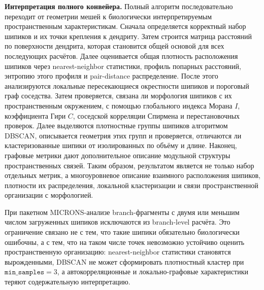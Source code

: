 \documentclass[12pt,a4paper]{article}
\begin{document}
\noindent\textbf{Интерпретация полного конвейера.}
Полный алгоритм последовательно переходит от геометрии мешей к биологически интерпретируемым пространственным характеристикам. Сначала определяется корректный набор шипиков и их точки крепления к дендриту. Затем строится матрица расстояний по поверхности дендрита, которая становится общей основой для всех последующих расчётов. Далее оценивается общая плотность расположения шипиков через nearest-neighbor статистики, профиль попарных расстояний, энтропию этого профиля и pair-distance распределение. После этого анализируются локальные пересекающиеся окрестности шипиков и пороговый граф соседства. Затем проверяется, связана ли морфология шипиков с их пространственным окружением, с помощью глобального индекса Морана \(I\), коэффициента Гири \(C\), соседской корреляции Спирмена и перестановочных проверок. Далее выделяются плотностные группы шипиков алгоритмом DBSCAN, описывается геометрия этих групп и проверяется, отличаются ли кластеризованные шипики от изолированных по объёму и длине. Наконец, графовые метрики дают дополнительное описание модульной структуры пространственных связей. Таким образом, результатом является не только набор отдельных метрик, а многоуровневое описание взаимного расположения шипиков, плотности их распределения, локальной кластеризации и связи пространственной организации с морфологией.

При пакетном MICRONS-анализе branch-фрагменты с двумя или меньшим числом загруженных шипиков исключаются из branch-level расчёта. Это ограничение связано не с тем, что такие шипики обязательно биологически ошибочны, а с тем, что на таком числе точек невозможно устойчиво оценить пространственную организацию: nearest-neighbor статистики становятся вырожденными, DBSCAN не может сформировать плотностный кластер при \(\texttt{min\_samples}=3\), а автокорреляционные и локально-графовые характеристики теряют содержательную интерпретацию.
\end{document}
